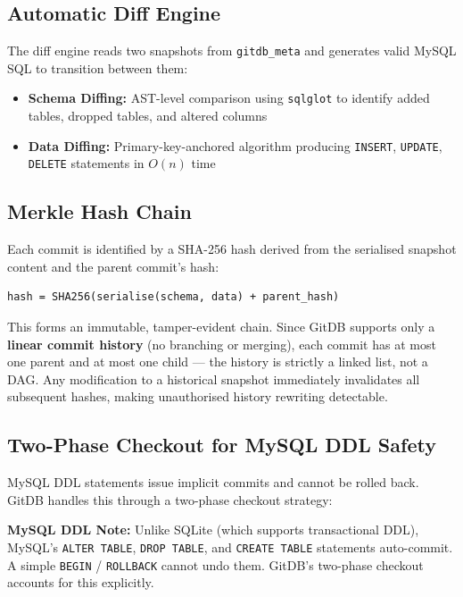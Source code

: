 \documentclass[12pt, a4paper]{article}
\begin{document}
\subsection{Automatic Diff Engine}

The diff engine reads two snapshots from \texttt{gitdb\_meta} and generates valid
MySQL SQL to transition between them:

\begin{itemize}[leftmargin=1.5em, itemsep=0.3em]
    \item \textbf{Schema Diffing:} AST-level comparison using \texttt{sqlglot}
    to identify added tables, dropped tables, and altered columns
    \item \textbf{Data Diffing:} Primary-key-anchored algorithm producing
    \texttt{INSERT}, \texttt{UPDATE}, \texttt{DELETE} statements in $O(n)$ time
\end{itemize}

\subsection{Merkle Hash Chain}

Each commit is identified by a SHA-256 hash derived from the serialised snapshot
content and the parent commit's hash:

\begin{tcolorbox}[commandbox, title=Hash Construction]
\begin{lstlisting}
hash = SHA256(serialise(schema, data) + parent_hash)
\end{lstlisting}
\end{tcolorbox}

This forms an immutable, tamper-evident chain. Since GitDB supports only a
\textbf{linear commit history} (no branching or merging), each commit has at most
one parent and at most one child --- the history is strictly a linked list, not a
DAG. Any modification to a historical snapshot immediately invalidates all
subsequent hashes, making unauthorised history rewriting detectable.

\subsection{Two-Phase Checkout for MySQL DDL Safety}

MySQL DDL statements issue implicit commits and cannot be rolled back. GitDB
handles this through a two-phase checkout strategy:

\begin{tcolorbox}[warningbox]
\textbf{MySQL DDL Note:} Unlike SQLite (which supports transactional DDL),
MySQL's \texttt{ALTER TABLE}, \texttt{DROP TABLE}, and \texttt{CREATE TABLE}
statements auto-commit. A simple \texttt{BEGIN} / \texttt{ROLLBACK} cannot undo
them. GitDB's two-phase checkout accounts for this explicitly.
\end{tcolorbox}
\end{document}
